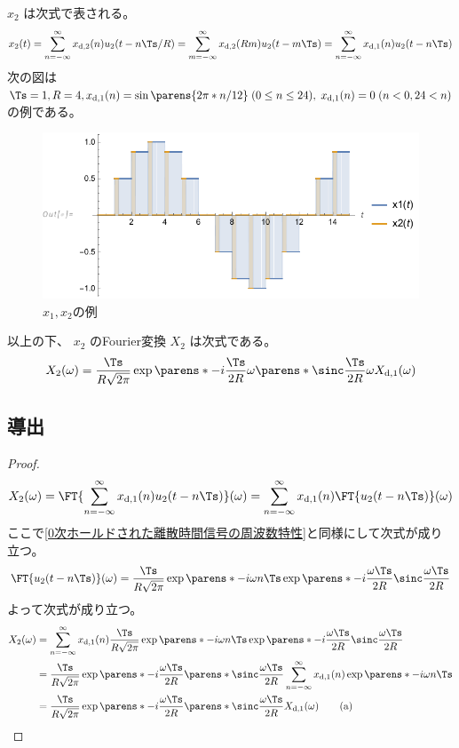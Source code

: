             $x_2$ は次式で表される。
            \[ x_2(t) = \sum_{n=-\infty}^\infty \xdb(n)u_2(t-n\Ts/R) = \sum_{m=-\infty}^\infty \xdb(R m)u_2(t-m\Ts) = \sum_{n=-\infty}^\infty \xda(n)u_2(t-n\Ts) \]
            次の図は $\Ts=1,R=4,\xda(n) = \sin\parens{2\pi*n/12}\;(0\leq n\leq 24),\;\xda(n) = 0\;(n<0,24<n)$ の例である。
            \begin{figure}[H]
                \centering
                \includegraphics[keepaspectratio, scale=0.8]
                {parts/time-discretization/chapters/up-sampling/imgs/x1,x2.pdf}
                \caption{$x_1,x_2$の例}
                \label{アップサンプリング前後のDAC出力の例}
            \end{figure}
            以上の下、 $x_2$ のFourier変換 $X_2$ は次式である。
            \[ X_2(\omega) = \frac{\Ts}{R\sqrt{2\pi}}\exp\parens*{-i\frac{\Ts}{2R}\omega}\parens*{\sinc \frac{\Ts}{2R}\omega}\Xda(\omega) \]
        \subsection{導出}
            \begin{proof}
                \quad\par
                \[ X_2(\omega) = \FT{\sum_{n=-\infty}^\infty \xda(n)u_2(t-n\Ts)}(\omega) = \sum_{n=-\infty}^\infty \xda(n)\FT{u_2(t-n\Ts)}(\omega) \]
                ここで\ref{0次ホールドされた離散時間信号の周波数特性}と同様にして次式が成り立つ。
                \[ \FT{u_2(t-n\Ts)}(\omega) = \frac{\Ts}{R\sqrt{2\pi}}\exp\parens*{-i \omega n\Ts}\exp\parens*{-i\frac{\omega\Ts}{2R}}\sinc\frac{\omega\Ts}{2R} \]
                よって次式が成り立つ。
                \begin{align*}
                    X_2(\omega) &= \sum_{n=-\infty}^\infty \xda(n)\frac{\Ts}{R\sqrt{2\pi}}\exp\parens*{-i \omega n\Ts}\exp\parens*{-i\frac{\omega\Ts}{2R}}\sinc\frac{\omega\Ts}{2R} \\
                    &= \frac{\Ts}{R\sqrt{2\pi}}\exp\parens*{-i\frac{\omega\Ts}{2R}}\parens*{\sinc\frac{\omega\Ts}{2R}} \sum_{n=-\infty}^\infty \xda(n)\exp\parens*{-i \omega n\Ts} \\
                    &= \frac{\Ts}{R\sqrt{2\pi}}\exp\parens*{-i\frac{\omega\Ts}{2R}}\parens*{\sinc\frac{\omega\Ts}{2R}} \Xda(\omega) \tag{a}
                \end{align*}
            \end{proof}
